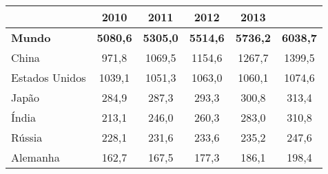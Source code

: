 \begin{table}[!ht]
	\centering
	\begin{tabular}{lccccc}
		\rowcolor[HTML]{9B9B9B} 
		\multicolumn{1}{c}{\cellcolor[HTML]{9B9B9B}} & {\color[HTML]{FFFFFF} \textbf{2010}} & {\color[HTML]{FFFFFF} \textbf{2011}} & {\color[HTML]{FFFFFF} \textbf{2012}} & {\color[HTML]{FFFFFF} \textbf{2013}} & \multicolumn{1}{l}{\cellcolor[HTML]{9B9B9B}{\color[HTML]{FFFFFF} \textbf{2014}}} \\ \hline
		\textbf{Mundo}                               & \multicolumn{1}{l}{\textbf{5080,6}}  & \multicolumn{1}{l}{\textbf{5305,0}}  & \multicolumn{1}{l}{\textbf{5514,6}}  & \multicolumn{1}{l}{\textbf{5736,2}}  & \multicolumn{1}{l}{\textbf{6038,7}}                                              \\ \hline
		\rowcolor[HTML]{DDDDDD} 
		China                                        & 971,8                                & 1069,5                               & 1154,6                               & 1267,7                               & 1399,5                                                                           \\
		Estados Unidos                               & 1039,1                               & 1051,3                               & 1063,0                               & 1060,1                               & 1074,6                                                                           \\
		\rowcolor[HTML]{DDDDDD} 
		Japão                                        & 284,9                                & 287,3                                & 293,3                                & 300,8                                & 313,4                                                                            \\
		Índia                                        & 213,1                                & 246,0                                & 260,3                                & 283,0                                & 310,8                                                                            \\
		\rowcolor[HTML]{DDDDDD} 
		Rússia                                       & 228,1                                & 231,6                                & 233,6                                & 235,2                                & 247,6                                                                            \\
		Alemanha                                     & 162,7                                & 167,5                                & 177,3                                & 186,1                                & 198,4                                                                            \\

\end{tabular}
\end{table}
